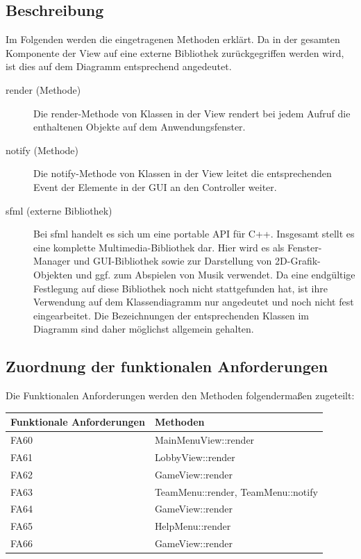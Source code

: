 \subsection{Beschreibung}
	Im Folgenden werden die eingetragenen Methoden erklärt. Da in der gesamten Komponente der View auf eine externe Bibliothek zurückgegriffen werden wird, ist dies auf dem Diagramm entsprechend angedeutet.
\begin{description}
	\item[render (Methode)]
		Die render-Methode von Klassen in der View rendert bei jedem Aufruf die enthaltenen Objekte auf dem Anwendungsfenster.
	\item[notify (Methode)]
		Die notify-Methode von Klassen in der View leitet die entsprechenden Event der Elemente in der GUI an den Controller weiter.
	
	\item[sfml (externe Bibliothek)]
		Bei sfml handelt es sich um eine portable API für C++. Insgesamt stellt es eine komplette Multimedia-Bibliothek dar. Hier wird es als Fenster-Manager und GUI-Bibliothek sowie zur Darstellung von 2D-Grafik-Objekten und ggf. zum Abspielen von Musik verwendet.
		Da eine endgültige Festlegung auf diese Bibliothek noch nicht stattgefunden hat, ist ihre Verwendung auf dem Klassendiagramm nur angedeutet und noch nicht fest eingearbeitet. Die Bezeichnungen der entsprechenden Klassen im Diagramm sind daher möglichst allgemein gehalten.
\end{description}


\subsection{Zuordnung der funktionalen Anforderungen}
Die Funktionalen Anforderungen werden den Methoden folgendermaßen zugeteilt:
\begin{center}
	\begin{tabular}{|l|l|}
		\hline
		\textbf{Funktionale Anforderungen} & \textbf{Methoden}\\\hline
		FA60 & MainMenuView::render\\
		FA61& LobbyView::render\\\hline
		FA62 & GameView::render\\\hline
		FA63 & TeamMenu::render, TeamMenu::notify\\\hline
		FA64 & GameView::render\\\hline
		FA65 & HelpMenu::render\\\hline
		FA66 & GameView::render\\\hline
		
	\end{tabular}
\end{center}
